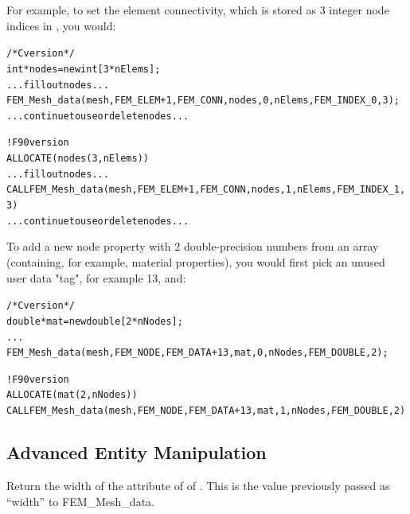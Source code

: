 For example, to set the element connectivity, which is stored as 
3 integer node indices in , you would:

  \begin{alltt}
/* C version */
   int *nodes=new int[3*nElems];
   ... fill out nodes ...
   FEM\_Mesh\_data(mesh,FEM\_ELEM+1,FEM\_CONN, nodes, 0,nElems, FEM\_INDEX\_0, 3);
   ... continue to use or delete nodes ...
   
! F90 version
   ALLOCATE(nodes(3,nElems))
   ... fill out nodes ...
   CALL FEM\_Mesh\_data(mesh,FEM\_ELEM+1,FEM\_CONN, nodes, 1,nElems, FEM\_INDEX\_1, 3)
   ... continue to use or delete nodes ...
  \end{alltt}

To add a new node property with 2 double-precision numbers 
from an array  (containing, for example,
material properties), you would first pick an unused
user data "tag", for example 13, and:

  \begin{alltt}
/* C version */
   double *mat=new double[2*nNodes];
   ...
   FEM\_Mesh\_data(mesh,FEM\_NODE, FEM\_DATA+13, mat, 0,nNodes, FEM\_DOUBLE, 2);
   
! F90 version
   ALLOCATE(mat(2,nNodes))
   CALL FEM\_Mesh\_data(mesh,FEM\_NODE,FEM\_DATA+13, mat, 1,nNodes, FEM\_DOUBLE, 2)
  \end{alltt}


\subsection{Advanced Entity Manipulation}


Return the width of the attribute  of  of .
This is the value previously passed as ``width'' to FEM\_Mesh\_data.



